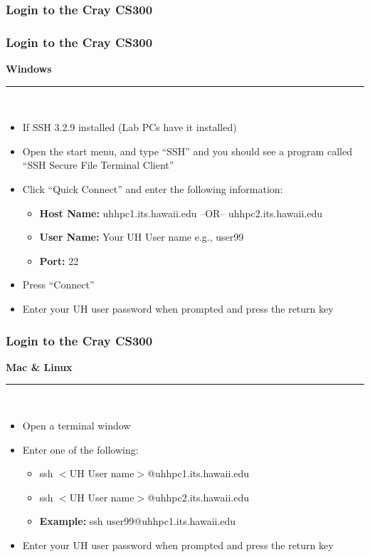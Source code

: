 \documentclass[t,hyperref={pdfpagelabels=false}]{beamer}
\begin{document}
\subsubsection{Login to the Cray CS300}
\begin{frame}
\frametitle{Login to the Cray CS300}
	\begin{center}\textbf{Windows}\end{center}
	\hrule~\\
	\begin{itemize}
		\item If SSH 3.2.9 installed (Lab PCs have it installed)
		\item Open the start menu, and type ``SSH'' and you should see a program called ``SSH Secure File Terminal Client''
		\item Click ``Quick Connect'' and enter the following information:
			\begin{itemize}
			\item[] \textbf{Host Name:} uhhpc1.its.hawaii.edu --OR-- uhhpc2.its.hawaii.edu
			\item[] \textbf{User Name:} Your UH User name e.g., user99
			\item[] \textbf{Port:} 22
			\end{itemize}
		\item Press ``Connect''
		\item Enter your UH user password when prompted and press the return key
	\end{itemize}
\end{frame}


\begin{frame}
\frametitle{Login to the Cray CS300}
	\begin{center}\textbf{Mac \& Linux}\end{center}
	\hrule~\\
	\begin{itemize}
		\item Open a terminal window
		\item Enter one of the following:
		\begin{itemize}
			\item ssh $<$UH User name$>$@uhhpc1.its.hawaii.edu
			\item ssh $<$UH User name$>$@uhhpc2.its.hawaii.edu
			\item \textbf{Example:} ssh user99@uhhpc1.its.hawaii.edu
		\end{itemize}
		\item Enter your UH user password when prompted and press the return key
	\end{itemize}
\end{frame}
\end{document}
